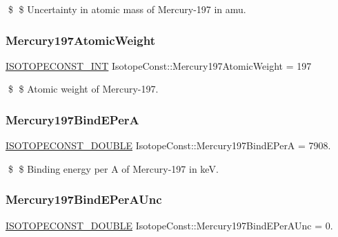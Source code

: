 \$ \$ Uncertainty in atomic mass of Mercury-\/197 in amu. \mbox{\label{group___isotope_const-_mercury-_hg197_gaeb85776a1aa99d17f6ea8bb05a5e7059}} 
\subsubsection{\texorpdfstring{Mercury197\+Atomic\+Weight}{Mercury197AtomicWeight}}
{\footnotesize\ttfamily \mbox{\hyperlink{group___isotope_const-_macros_ga5f18360b3e99483a35c32d789e62621c}{I\+S\+O\+T\+O\+P\+E\+C\+O\+N\+S\+T\+\_\+\+I\+NT}} Isotope\+Const\+::\+Mercury197\+Atomic\+Weight = 197}

\$ \$ Atomic weight of Mercury-\/197. \mbox{\label{group___isotope_const-_mercury-_hg197_gab9a16fbde5bd358f71085ee8c8d562d0}} 
\subsubsection{\texorpdfstring{Mercury197\+Bind\+E\+PerA}{Mercury197BindEPerA}}
{\footnotesize\ttfamily \mbox{\hyperlink{group___isotope_const-_macros_ga8f45a7272ce02c0b4c65c44636ed719a}{I\+S\+O\+T\+O\+P\+E\+C\+O\+N\+S\+T\+\_\+\+D\+O\+U\+B\+LE}} Isotope\+Const\+::\+Mercury197\+Bind\+E\+PerA = 7908.}

\$ \$ Binding energy per A of Mercury-\/197 in keV. \mbox{\label{group___isotope_const-_mercury-_hg197_ga78a35919b8215b7ae2cc7b317404d200}} 
\subsubsection{\texorpdfstring{Mercury197\+Bind\+E\+Per\+A\+Unc}{Mercury197BindEPerAUnc}}
{\footnotesize\ttfamily \mbox{\hyperlink{group___isotope_const-_macros_ga8f45a7272ce02c0b4c65c44636ed719a}{I\+S\+O\+T\+O\+P\+E\+C\+O\+N\+S\+T\+\_\+\+D\+O\+U\+B\+LE}} Isotope\+Const\+::\+Mercury197\+Bind\+E\+Per\+A\+Unc = 0.}

